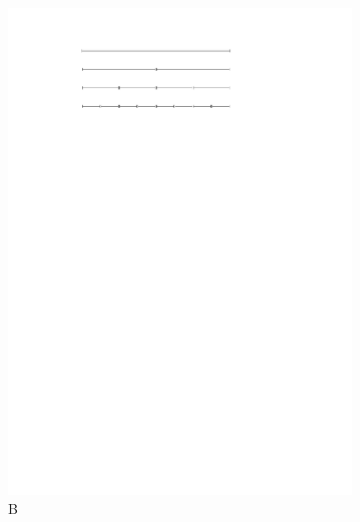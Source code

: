 \documentclass[english,gradu]{tktltiki2018}
\begin{document}
\begin{figure}
\begin{subfigure}[t]{0.32\textwidth}
		\includegraphics[width=\textwidth,page=4]{fig/iproof}
		\caption{B}\label{fig:iproof:anc}
	\end{subfigure}
	\hfil
	\begin{subfigure}[t]{0.32\textwidth}\centering

\end{subfigure}
\end{figure}
\end{document}
